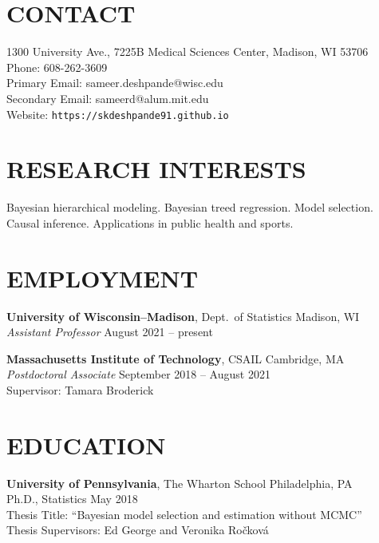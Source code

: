 \documentclass[margin]{res}
\begin{document}
  
                        
\begin{resume}                        
  
  \section{CONTACT} 
  1300 University Ave., 7225B Medical Sciences Center, Madison, WI 53706 \\
  Phone: 608-262-3609 \\ 
  Primary Email: sameer.deshpande@wisc.edu \\
  Secondary Email: sameerd@alum.mit.edu \\
  Website: \texttt{https://skdeshpande91.github.io}

  \section{RESEARCH INTERESTS}
Bayesian hierarchical modeling. Bayesian treed regression. Model selection. Causal inference. Applications in public health and sports. 
              
\section{EMPLOYMENT} 

\textbf{University of Wisconsin--Madison}, Dept.~of Statistics \hfill Madison, WI \\
\textit{Assistant Professor} \hfill August 2021 -- present

\textbf{Massachusetts Institute of Technology}, CSAIL \hfill Cambridge, MA \\
\emph{Postdoctoral Associate} \hfill September 2018 -- August 2021 \\
Supervisor: Tamara Broderick
              
\section{EDUCATION}      
                {\bf University of Pennsylvania}, The Wharton School \hfill Philadelphia, PA \\
                Ph.D., Statistics \hfill May 2018 \\
		Thesis Title: ``Bayesian model selection and estimation without MCMC'' \\
		Thesis Supervisors: Ed George and Veronika Ro\v{c}kov\'{a}
                

\end{resume}
\end{document}
